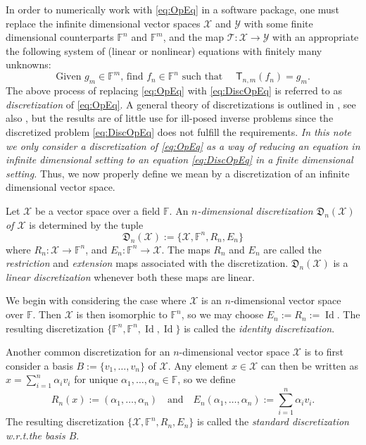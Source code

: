 \documentclass[a4paper]{paper}
\newcommand{\discr}{\mathfrak{D}}
\newcommand{\VecSpace}[1]{\mathscr{#1}}
\newcommand{\Field}{\mathbb{F}}
\newcommand{\Op}[1]{\mathcal{#1}}
\newcommand{\DiscOp}[1]{\mathsf{#1}}
\DeclareMathOperator{\Id}{Id}
\begin{document}
In order to numerically work with \eqref{eq:OpEq} in a software package, one must replace the 
infinite dimensional vector spaces $\VecSpace{X}$ and $\VecSpace{Y}$ with some finite dimensional 
counterparts $\Field^{n}$ and $\Field^{m}$, and the map 
$\Op{T} \colon \VecSpace{X} \to \VecSpace{Y}$ with an appropriate
the following system of (linear or nonlinear) equations with finitely many unknowns:
\begin{equation}\label{eq:DiscOpEq}
  \text{Given $g_{m} \in \Field^{m}$, find $f_n \in \Field^{n}$ such that }\quad \DiscOp{T}_{n,m} (f_{n})=g_{m}. 
\end{equation}
The above process of replacing \eqref{eq:OpEq} with \eqref{eq:DiscOpEq} is referred to 
as \emph{discretization} of \eqref{eq:OpEq}. A general theory of discretizations is outlined in 
\cite[Chapter~34]{ZeIIB85}, see also \cite{Pe93}, but the results are of little use for ill-posed inverse 
problems since the discretized problem \eqref{eq:DiscOpEq} does not fulfill the requirements.
\emph{In this note we only consider a discretization of \eqref{eq:OpEq} 
as a way of reducing an equation in infinite dimensional setting to an equation 
\eqref{eq:DiscOpEq} in a finite dimensional setting.}
Thus, we now properly define we mean by a discretization of an 
infinite dimensional vector space.
\begin{definition}
  Let $\VecSpace{X}$ be a vector space over a field $\Field$. An \emph{$n$-dimensional discretization 
  $\discr_{n}(\VecSpace{X})$ of $\VecSpace{X}$} is determined by the tuple 
  \[
     \discr_{n}(\VecSpace{X}) := \bigl\{ \VecSpace{X},\Field^{n},R_{n},E_{n} \bigr\} 
  \]
  where 
  $R_{n} \colon \VecSpace{X} \to \Field^{n}$, and $E_{n} \colon \Field^{n} \to \VecSpace{X}$.
  The maps $R_{n}$ and $E_{n}$ are called the  \emph{restriction} and 
  \emph{extension} maps associated with the discretization. $\discr_{n}(\VecSpace{X})$ is a 
  \emph{linear discretization} whenever both these maps are linear.
\end{definition}

\begin{examp}
We begin with considering the case where $\VecSpace{X}$ is an $n$-dimensional vector space over $\Field$. 
Then $\VecSpace{X}$ is then isomorphic to $\Field^{n}$, so we may choose 
$E_{n}:=R_{n}:=\Id$. The resulting discretization $\{ \Field^n,\Field^n,\Id,\Id \}$ is called the  
\emph{identity discretization}. 
\end{examp}

\begin{examp}
Another common discretization for an $n$-dimensional vector space $\VecSpace{X}$ is to first consider 
a basis $B:=\{ v_1,\ldots,v_{n}\}$ of $\VecSpace{X}$. Any element $x\in \VecSpace{X}$ can then 
be written as $x=\sum_{i=1}^n \alpha_i v_i$ for unique $\alpha_1,\ldots,\alpha_{n}\in\Field$, so we define 
\[
   R_{n}(x) := (\alpha_1,\ldots,\alpha_{n}) \quad\text{and}\quad
   E_{n}(\alpha_1,\ldots,\alpha_{n}) := \sum_{i=1}^n \alpha_i v_i. 
\]
The resulting discretization $\{ \VecSpace{X},\Field^{n},R_{n},E_{n}\}$ is called the \emph{standard discretization
w.r.t.\@ the basis $B$}.
\end{examp}
\end{document}

